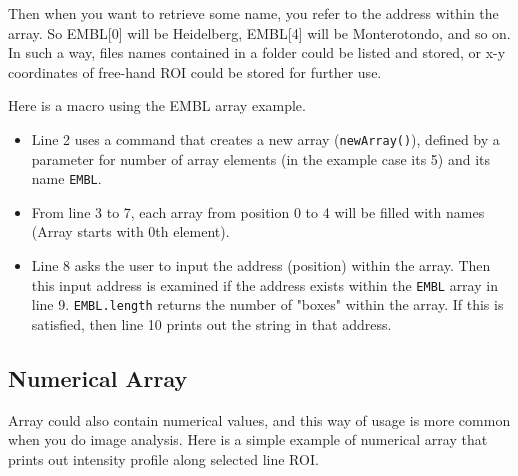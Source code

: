\documentclass[11pt,a4paper,oneside]{report}
\newcommand{\ilcom}[1]{\texttt{\small#1}}
\begin{document}
Then when you want to retrieve some name, you refer to the address within the array. So EMBL[0] will be Heidelberg, EMBL[4] will be Monterotondo, and so on. In such a way, files names contained in a folder could be listed and stored, or x-y coordinates of free-hand ROI could be stored for further use. 

Here is a macro using the EMBL array example. 



\begin{itemize}
\item Line 2 uses a command that creates a new array (\ilcom{newArray()}), defined by a parameter for number of array elements (in the example case its 5) and its name \ilcom{EMBL}. 
\item From line 3 to 7, each array from position 0 to 4 will be filled with names (Array starts with 0th element). 
\item Line 8 asks the user to input the address (position) within the array. Then this input address is examined if the address exists within the \ilcom{EMBL} array in line 9. \ilcom{EMBL.length} returns the number of "boxes" within the array. If this is satisfied, then line 10 prints out the string in that address.
\end{itemize}

\subsection{Numerical Array}

Array could also contain numerical values, and this way of usage is more common when you do image analysis. Here is a simple example of numerical array that prints out intensity profile along selected line ROI. 


\end{document}
